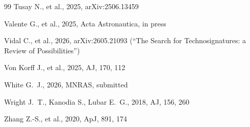 \documentclass{openjournal}
\begin{document}
\begin{thebibliography}{99}
 Tusay N., et al., 2025, arXiv:2506.13459

 Valente G., et al., 2025, Acta Astronautica, in press

 Vidal C., et al., 2026, arXiv:2605.21093 (``The Search for Technosignatures: a Review of Possibilities'')

 Von Korff J., et al., 2025, AJ, 170, 112

 White G.~J., 2026, MNRAS, submitted

 Wright J.~T., Kanodia S., Lubar E.~G., 2018, AJ, 156, 260

 Zhang Z.-S., et al., 2020, ApJ, 891, 174

\end{thebibliography}
\end{document}
